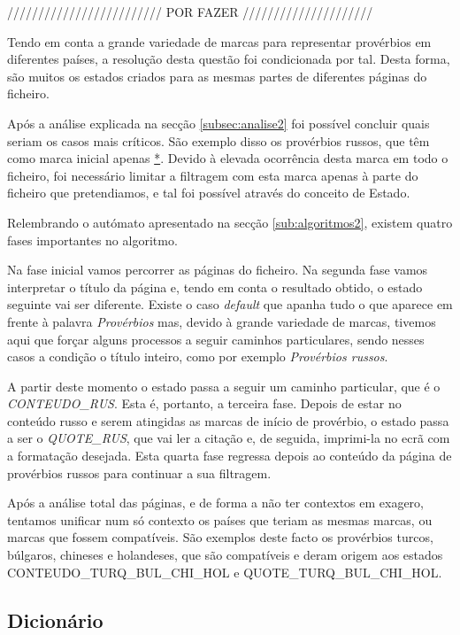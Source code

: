 \documentclass[11pt,a4paper]{report}
\begin{document}
///////////////////////// POR FAZER /////////////////////

Tendo em conta a grande variedade de marcas para representar provérbios em diferentes países, a resolução desta questão foi condicionada por tal. Desta forma, são muitos os estados criados para as mesmas partes de diferentes páginas do ficheiro.

Após a análise explicada na secção \ref{subsec:analise2} foi possível concluir quais seriam os casos mais críticos. São exemplo disso os provérbios russos, que têm como marca inicial apenas \underline{*}. Devido à elevada ocorrência desta marca em todo o ficheiro, foi necessário limitar a filtragem com esta marca apenas à parte do ficheiro que pretendiamos, e tal foi possível através do conceito de Estado.

Relembrando o autómato apresentado na secção \ref{sub:algoritmos2}, existem quatro fases importantes no algoritmo.

Na fase inicial vamos percorrer as páginas do ficheiro. Na segunda fase vamos interpretar o título da página e, tendo em conta o resultado obtido, o estado seguinte vai ser diferente. Existe o caso \textit{default} que apanha tudo o que aparece em frente à palavra \textit{Provérbios} mas, devido à grande variedade de marcas, tivemos aqui que forçar alguns processos a seguir caminhos particulares, sendo nesses casos a condição o título inteiro, como por exemplo \textit{Provérbios russos}.

A partir deste momento o estado passa a seguir um caminho particular, que é o \textit{CONTEUDO\_RUS}. Esta é, portanto, a terceira fase. Depois de estar no conteúdo russo e serem atingidas as marcas de início de provérbio, o estado passa a ser o \textit{QUOTE\_RUS}, que vai ler a citação e, de seguida, imprimi-la no ecrã com a formatação desejada. Esta quarta fase regressa depois ao conteúdo da página de provérbios russos para continuar a sua filtragem.

Após a análise total das páginas, e de forma a não ter contextos em exagero, tentamos unificar num só contexto os países que teriam as mesmas marcas, ou marcas que fossem compatíveis. São exemplos deste facto os provérbios turcos, búlgaros, chineses e holandeses, que são compatíveis e deram origem aos estados CONTEUDO\_TURQ\_BUL\_CHI\_HOL e QUOTE\_TURQ\_BUL\_CHI\_HOL.


\newpage

\subsection{Dicionário}
\end{document}
